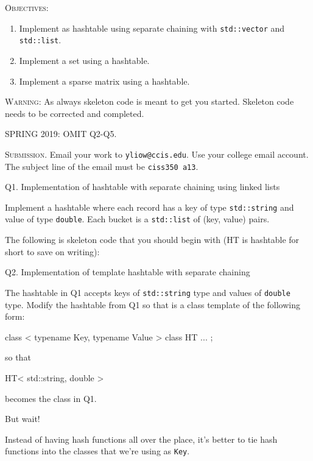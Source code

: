 


\renewcommand\TITLE{Assignment 13}


\usepackage{listings}
\lstset{%
basicstyle=\ttfamily, frame=single
}



\topmatter


\textsc{Objectives:}
\begin{enumerate}[topsep=0pt]
\item Implement as hashtable using separate chaining with
  \verb!std::vector! 
  and \verb!std::list!.
\item Implement a set using a hashtable.
\item Implement a sparse matrix using a hashtable.
\end{enumerate}

\textsc{Warning}:
As always skeleton code is meant to get you started.
Skeleton code needs to be corrected and completed.

SPRING 2019: OMIT Q2-Q5.

\textsc{Submission}.
Email your work to \verb!yliow@ccis.edu!.
Use your college email account.
The subject line of the email must be \verb!ciss350 a13!.

\newpage
Q1. Implementation of hashtable with separate chaining using
linked lists

Implement a hashtable where each record has a key of type 
\verb!std::string! and value of type \verb!double!.
Each bucket is a \verb!std::list! of (key, value) pairs.

The following is skeleton code that you should begin with (HT is hashtable for short
to save on writing):
{\small
{}
}


\newpage
Q2. Implementation of template hashtable with separate chaining

The hashtable in Q1 accepts keys of \verb!std::string! type
and values of \verb!double! type.
Modify the hashtable from Q1 so that is a class template of the following
form:
\begin{console}
class < typename Key, typename Value >
class HT
{
    ...
};
\end{console}
so that
\begin{console}
HT< std::string, double >
\end{console}
becomes the class in Q1.

But wait!

Instead of having hash functions all over the place, it's better to tie
hash functions into the classes that we're using as \verb!Key!.


